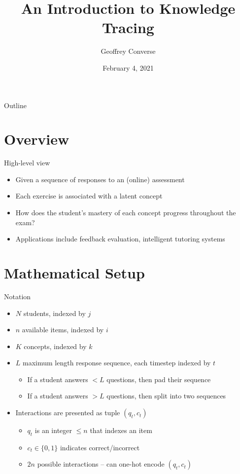 \documentclass{beamer}
\title[Knowledge Tracing]{An Introduction to Knowledge Tracing}
\author{Geoffrey Converse}
\institute{University of Iowa}
\date{February 4, 2021}
\theoremstyle{definition}
\begin{document}
\begin{frame}
  \titlepage
\end{frame}


\begin{frame}{Outline}
  \tableofcontents
\end{frame}

\section{Overview}

\begin{frame}{High-level view}
  \begin{itemize}
    \item Given a sequence of responses to an (online) assessment
    \item Each exercise is associated with a latent concept
    \item How does the student's mastery of each concept progress throughout the exam?
    \item Applications include feedback evaluation, intelligent tutoring systems
  \end{itemize}
\end{frame}


\section{Mathematical Setup}

\begin{frame}{Notation}
  \begin{itemize}
    \item $N$ students, indexed by $j$
    \item $n$ available items, indexed by $i$
    \item $K$ concepts, indexed by $k$
    \item $L$ maximum length response sequence, each timestep indexed by $t$
      \begin{itemize}
        \item If a student answers $<L$ questions, then pad their sequence
        \item If a student answers $>L$ questions, then split into two sequences
      \end{itemize}
    \item Interactions are presented as tuple $(q_t, c_t)$ 
      \begin{itemize}
        \item $q_t$ is an integer $\leq n$ that indexes an item
        \item $c_t \in \{0,1\}$ indicates correct/incorrect
        \item $2n$ possible interactions -- can one-hot encode $(q_t,c_t)$
      \end{itemize}
  \end{itemize}
\end{frame}
\end{document}
